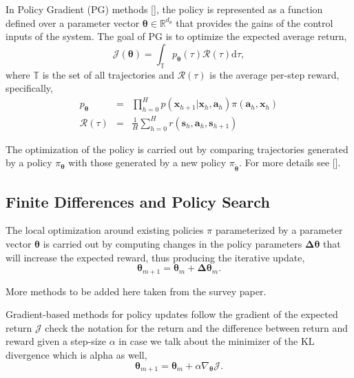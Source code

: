 \documentclass{aamas2016}
\renewcommand{\Re}{\mathbb{R}}
\begin{document}
In Policy Gradient (PG) methods [], the policy is represented as a function defined over a parameter vector 
$\boldsymbol{\theta} \in \Re^{d_{\theta}}$ that provides the gains of the control inputs of the system. The goal of PG is to optimize
the expected average return,
\begin{equation}
 \mathcal{J}(\boldsymbol{\theta})=\int_{\mathbb{T}}p_{\boldsymbol{\theta}}(\tau)\mathcal{R}(\tau)\mbox{d}\tau,
 \label{retPG}
\end{equation}
where $\mathbb{T}$ is the set of all trajectories and $\mathcal{R}(\tau)$ is the average per-step reward, specifically,
\begin{eqnarray}
 p_{\boldsymbol{\theta}} & = & \prod_{h=0}^{H}p(\mathbf{x}_{h+1}|\mathbf{x}_{h},\mathbf{a}_{h})\pi(\mathbf{a}_{h},\mathbf{x}_{h}) \nonumber \\
 \mathcal{R}(\tau) & = & \frac{1}{H}\sum_{h=0}^{H} r(\mathbf{s}_{h},\mathbf{a}_{h},\mathbf{s}_{h+1}) \nonumber
\end{eqnarray}

The optimization of the policy is carried out by comparing trajectories generated by a policy $\pi_{\boldsymbol{\theta}}$ with those
generated by a new policy $\pi_{\boldsymbol{\tilde{\theta}}}$. For more details see [].

\subsection{Finite Differences and Policy Search}
The local optimization around existing policies $\pi$ parameterized by a parameter vector $\boldsymbol{\theta}$ 
is carried out by computing changes in the policy parameters $\boldsymbol{\Delta \theta}$ that will increase the expected reward, thus
producing the iterative update,
\begin{displaymath}
 \boldsymbol{\theta}_{m+1} = \boldsymbol{\theta}_{m}+\boldsymbol{\Delta \theta}_{m}.
\end{displaymath}

{\color{red}More methods to be added here taken from the survey paper.}

Gradient-based methods for policy updates follow the gradient of the expected return $\mathcal{J}$ {\color{red}check the notation for the return
and the difference between return and reward} given a step-size $\alpha$ {\color{red} in case we talk about the minimizer of the KL
divergence which is alpha as well},
\begin{displaymath}
 \boldsymbol{\theta}_{m+1} = \boldsymbol{\theta}_{m}+\alpha\nabla_{\boldsymbol{\theta}}\mathcal{J}.
\end{displaymath}
\end{document}
